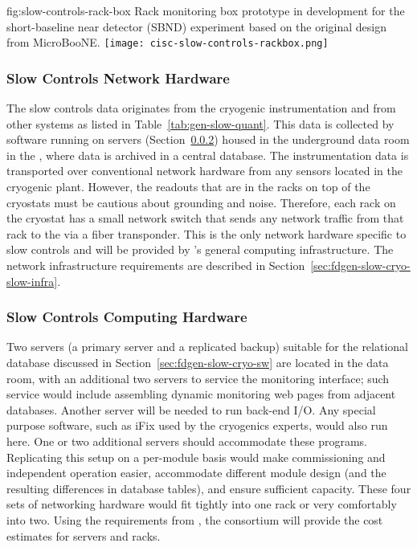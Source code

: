 \begin{dunefigure}{fig:slow-controls-rack-box}
{Rack monitoring box prototype in development for the short-baseline near detector (SBND) experiment based on the original design from MicroBooNE.}
\texttt{[image: cisc-slow-controls-rackbox.png]}
\end{dunefigure}


\subsubsection{Slow Controls Network Hardware}
\label{sec:fdgen-slow-cryo-slow-network}
The slow controls data originates from the cryogenic instrumentation and from other systems as listed in Table~\ref{tab:gen-slow-quant}. This data is collected by software running on servers
(Section~\ref{sec:fdgen-slow-cryo-slow-compute})
housed in the underground data room in the ,
where data is archived in a central  database.
The instrumentation data is transported over
conventional network hardware from any sensors located in the cryogenic
plant.  However, the readouts that are in the racks on top of the
cryostats must be cautious about grounding and noise.  Therefore, each
rack on the cryostat has a small network switch that sends
any network traffic from that rack to the  via a fiber transponder.
This is the only network hardware specific to slow controls and will be provided by %
\surf{}'s  
general computing infrastructure. %
The network infrastructure requirements are described in
Section~\ref{sec:fdgen-slow-cryo-slow-infra}.

\subsubsection{Slow Controls Computing Hardware}
\label{sec:fdgen-slow-cryo-slow-compute}
Two servers (a primary server and a replicated backup) suitable for the relational database discussed
in Section~\ref{sec:fdgen-slow-cryo-sw} are located in the  data
room, with an additional
two servers to service the  monitoring interface; such service would include assembling dynamic  monitoring web pages from adjacent
databases.  Another server will be needed to run back-end I/O.  Any special purpose software, such as iFix used by the cryogenics experts, would
also run here. One or two additional servers should accommodate these programs.
Replicating this setup on a per-module basis would make commissioning and independent operation easier, accommodate different module
design (and the resulting differences in database tables), and ensure
sufficient capacity.  These four sets of networking hardware would fit tightly into one rack or very comfortably into two. Using the requirements from , the  consortium will provide the cost estimates for servers and racks. 

